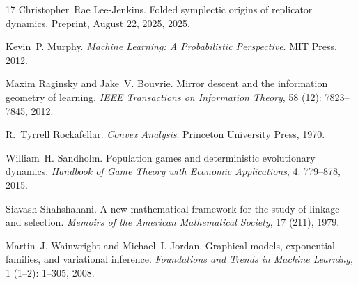 \documentclass[10pt,a4paper]{amsart}
\numberwithin{equation}{section}
\theoremstyle{plain}
\theoremstyle{definition}
\theoremstyle{remark}
\newcommand{\1}{\mathbbm{1}}
\begin{document}
\begin{thebibliography}{17}
Christopher~Rae Lee-Jenkins.
\newblock Folded symplectic origins of replicator dynamics.
\newblock Preprint, August 22, 2025, 2025.

Kevin~P. Murphy.
\newblock \emph{Machine Learning: A Probabilistic Perspective}.
\newblock MIT Press, 2012.

Maxim Raginsky and Jake~V. Bouvrie.
\newblock Mirror descent and the information geometry of learning.
\newblock \emph{IEEE Transactions on Information Theory}, 58
  (12): 7823--7845, 2012.

R.~Tyrrell Rockafellar.
\newblock \emph{Convex Analysis}.
\newblock Princeton University Press, 1970.

William~H. Sandholm.
\newblock Population games and deterministic evolutionary dynamics.
\newblock \emph{Handbook of Game Theory with Economic Applications},
  4: 779--878, 2015.

Siavash Shahshahani.
\newblock A new mathematical framework for the study of linkage and selection.
\newblock \emph{Memoirs of the American Mathematical Society}, 17
  (211), 1979.

Martin~J. Wainwright and Michael~I. Jordan.
\newblock Graphical models, exponential families, and variational inference.
\newblock \emph{Foundations and Trends in Machine Learning}, 1
  (1--2): 1--305, 2008.

\end{thebibliography}
\end{document}
